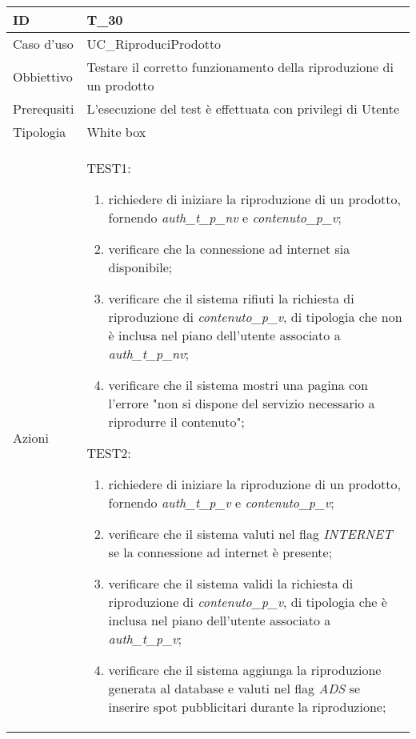 \begin{table}[hb]
    \centering
    \begin{tabular}{ |p{2cm}|p{10cm}|  }
        \hline
        ID          & T\_30                                                               \\\hline
        Caso d'uso  & UC\_RiproduciProdotto                                               \\\hline
        Obbiettivo  & Testare il corretto funzionamento della riproduzione di un prodotto \\\hline
        Prerequsiti & L'esecuzione del test è effettuata con privilegi di Utente          \\\hline
        Tipologia   & White box                                                           \\\hline
        Azioni      &
        TEST1:
        \begin{enumerate}[nosep, topsep=0pt]
            \item richiedere di iniziare la riproduzione di un prodotto, fornendo \emph{auth\_t\_p\_nv} e \emph{contenuto\_p\_v};
            \item verificare che la connessione ad internet sia disponibile;
            \item verificare che il sistema rifiuti la richiesta di riproduzione di \emph{contenuto\_p\_v}, di tipologia che non è inclusa nel piano dell'utente associato a \emph{auth\_t\_p\_nv};
            \item verificare che il sistema mostri una pagina con l'errore "non si dispone del servizio necessario a riprodurre il contenuto";
        \end{enumerate}
        \vspace{0.5cm} TEST2:
        \begin{enumerate}[nosep, topsep=0pt]
            \item richiedere di iniziare la riproduzione di un prodotto, fornendo \emph{auth\_t\_p\_v} e \emph{contenuto\_p\_v};
            \item verificare che il sistema valuti nel flag \emph{INTERNET} se la connessione ad internet è presente;
            \item verificare che il sistema validi la richiesta di riproduzione di \emph{contenuto\_p\_v}, di tipologia che è inclusa nel piano dell'utente associato a \emph{auth\_t\_p\_v};
            \item verificare che il sistema aggiunga la riproduzione generata al database e valuti nel flag \emph{ADS} se inserire spot pubblicitari durante la riproduzione;

\end{enumerate}
\end{tabular}
\end{table}
